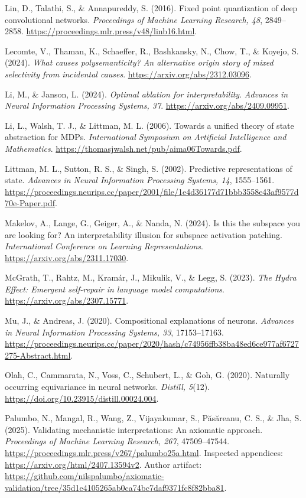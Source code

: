 \documentclass[
  british,
  11pt,
  a4paper,
]{article}
\begin{document}
Lin, D., Talathi, S., \& Annapureddy, S. (2016). Fixed point
quantization of deep convolutional networks. \emph{Proceedings of
Machine Learning Research, 48}, 2849--2858.
\url{https://proceedings.mlr.press/v48/linb16.html}.

Lecomte, V., Thaman, K., Schaeffer, R., Bashkansky, N., Chow, T., \&
Koyejo, S. (2024). \emph{What causes polysemanticity? An alternative
origin story of mixed selectivity from incidental causes}.
\url{https://arxiv.org/abs/2312.03096}.

Li, M., \& Janson, L. (2024). \emph{Optimal ablation for
interpretability}. \emph{Advances in Neural Information Processing
Systems, 37}. \url{https://arxiv.org/abs/2409.09951}.

Li, L., Walsh, T. J., \& Littman, M. L. (2006). Towards a unified theory
of state abstraction for MDPs. \emph{International Symposium on
Artificial Intelligence and Mathematics}.
\url{https://thomasjwalsh.net/pub/aima06Towards.pdf}.

Littman, M. L., Sutton, R. S., \& Singh, S. (2002). Predictive
representations of state. \emph{Advances in Neural Information
Processing Systems, 14}, 1555--1561.
\url{https://proceedings.neurips.cc/paper/2001/file/1e4d36177d71bbb3558e43af9577d70e-Paper.pdf}.

Makelov, A., Lange, G., Geiger, A., \& Nanda, N. (2024). Is this the
subspace you are looking for? An interpretability illusion for subspace
activation patching. \emph{International Conference on Learning
Representations}. \url{https://arxiv.org/abs/2311.17030}.

McGrath, T., Rahtz, M., Kramár, J., Mikulik, V., \& Legg, S. (2023).
\emph{The Hydra Effect: Emergent self-repair in language model
computations}. \url{https://arxiv.org/abs/2307.15771}.

Mu, J., \& Andreas, J. (2020). Compositional explanations of neurons.
\emph{Advances in Neural Information Processing Systems, 33},
17153--17163.
\url{https://proceedings.neurips.cc/paper/2020/hash/c74956ffb38ba48ed6ce977af6727275-Abstract.html}.

Olah, C., Cammarata, N., Voss, C., Schubert, L., \& Goh, G. (2020).
Naturally occurring equivariance in neural networks. \emph{Distill,
5}(12). \url{https://doi.org/10.23915/distill.00024.004}.

Palumbo, N., Mangal, R., Wang, Z., Vijayakumar, S., Păsăreanu, C. S., \&
Jha, S. (2025). Validating mechanistic interpretations: An axiomatic
approach. \emph{Proceedings of Machine Learning Research, 267},
47509--47544. \url{https://proceedings.mlr.press/v267/palumbo25a.html}.
Inspected appendices: \url{https://arxiv.org/html/2407.13594v2}. Author
artifact:
\url{https://github.com/nilspalumbo/axiomatic-validation/tree/35d1e4105265ab0ca74bc7daf9371fc8f82bba81}.
\end{document}

